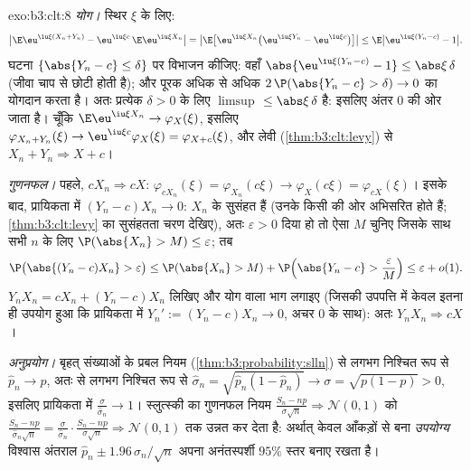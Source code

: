 \begin{solution}{exo:b3:clt:8}
\emph{योग।} स्थिर $\xi$ के लिए:
\[
\bigl|\E\eu^{\iu\xi(X_n+Y_n)} -
\eu^{\iu\xi c}\,\E\eu^{\iu\xi X_n}\bigr|
= \bigl|\E\bigl[\eu^{\iu\xi X_n}\bigl(\eu^{\iu\xi Y_n} -
\eu^{\iu\xi c}\bigr)\bigr]\bigr|
\leq \E\bigl|\eu^{\iu\xi(Y_n - c)} - 1\bigr| .
\]
घटना $\{\abs{Y_n - c} \leq \delta\}$ पर विभाजन कीजिए: वहाँ
$\abs{\eu^{\iu\xi(Y_n-c)} - 1} \leq \abs\xi\,\delta$ (जीवा
चाप से छोटी होती है); और पूरक अधिक से अधिक
$2\,\P(\abs{Y_n - c} > \delta) \to 0$ का योगदान करता है। अतः
प्रत्येक $\delta > 0$ के लिए $\limsup$ $\leq
\abs\xi\,\delta$ है: इसलिए अंतर $0$ की ओर जाता है। चूँकि
$\E\eu^{\iu\xi X_n} \to
\varphi_X(\xi)$, इसलिए $\varphi_{X_n+Y_n}(\xi) \to
\eu^{\iu\xi c}\varphi_X(\xi) = \varphi_{X+c}(\xi)$, और लेवी
(\cref{thm:b3:clt:levy}) से $X_n + Y_n
\Rightarrow X + c$।

\emph{गुणनफल।} पहले, $cX_n \Rightarrow cX$:
$\varphi_{cX_n}(\xi) = \varphi_{X_n}(c\xi) \to
\varphi_X(c\xi) = \varphi_{cX}(\xi)$। इसके बाद, प्रायिकता
में $(Y_n - c)X_n \to 0$: $X_n$ के  सुसंहत हैं
(उनके  किसी  की ओर अभिसरित होते
हैं; \cref{thm:b3:clt:levy} का सुसंहतता चरण देखिए), अतः
$\varepsilon > 0$ दिया हो तो ऐसा $M$ चुनिए जिसके साथ सभी $n$
के लिए $\P(\abs{X_n} > M) \leq \varepsilon$; तब
\[
\P\bigl(\abs{(Y_n - c)X_n} > \varepsilon\bigr) \leq
\P(\abs{X_n} > M) + \P\Bigl(\abs{Y_n - c} >
\frac{\varepsilon}{M}\Bigr) \leq \varepsilon + o(1) .
\]
$Y_nX_n = cX_n + (Y_n - c)X_n$ लिखिए और योग वाला भाग लगाइए
(जिसकी उपपत्ति में केवल इतना ही उपयोग हुआ कि प्रायिकता में
$Y_n' := (Y_n - c)X_n \to 0$, अचर $0$ के साथ): अतः $Y_nX_n
\Rightarrow cX$।

\emph{अनुप्रयोग।} बृहत् संख्याओं के प्रबल नियम
(\cref{thm:b3:probability:slln}) से लगभग निश्चित रूप से
$\hat p_n \to p$, अतः  से लगभग निश्चित रूप से
$\hat\sigma_n = \sqrt{\hat p_n(1 - \hat p_n)}
\to \sigma = \sqrt{p(1 - p)} > 0$, इसलिए प्रायिकता में
$\frac{\sigma}{\hat\sigma_n} \to 1$। स्लुत्स्की का गुणनफल
नियम $\frac{S_n - np}{\sigma\sqrt n}
\Rightarrow \mathcal N(0,1)$ को $\frac{S_n -
np}{\hat\sigma_n\sqrt n} = \frac{\sigma}{\hat\sigma_n}\cdot
\frac{S_n - np}{\sigma\sqrt n} \Rightarrow \mathcal N(0,1)$
तक उन्नत कर देता है: अर्थात् केवल आँकड़ों से बना
\emph{उपयोग्य} विश्वास अंतराल $\hat p_n \pm
1.96\,\hat\sigma_n/\sqrt n$ अपना अनंतस्पर्शी $95\%$ स्तर
बनाए रखता है।
\end{solution}

